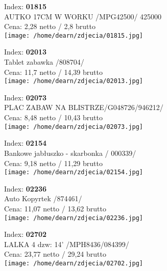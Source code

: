 {Index: \textbf{01815}\\
AUTKO 17CM W WORKU  /MPG42500/                  425000\\
Cena: 2,28 netto / 2,8 brutto\\
  \texttt{[image: /home/dearn/zdjecia/01815.jpg]}}\newline\newline

{Index: \textbf{02013}\\
Tablet zabawka /808704/\\
Cena: 11,7 netto / 14,39 brutto\\
  \texttt{[image: /home/dearn/zdjecia/02013.jpg]}}\newline\newline

{Index: \textbf{02073}\\
PLAC ZABAW NA BLISTRZE/G048726/946212/\\
Cena: 8,48 netto / 10,43 brutto\\
  \texttt{[image: /home/dearn/zdjecia/02073.jpg]}}\newline\newline

{Index: \textbf{02154}\\
Bankowe jabłuszko - skarbonka / 000339/\\
Cena: 9,18 netto / 11,29 brutto\\
  \texttt{[image: /home/dearn/zdjecia/02154.jpg]}}\newline\newline

{Index: \textbf{02236}\\
Auto Kopyrtek /874461/\\
Cena: 11,07 netto / 13,62 brutto\\
  \texttt{[image: /home/dearn/zdjecia/02236.jpg]}}\newline\newline

{Index: \textbf{02702}\\
LALKA 4 dzw: 14' /MPH8436/084399/\\
Cena: 23,77 netto / 29,24 brutto\\
  \texttt{[image: /home/dearn/zdjecia/02702.jpg]}}\newline\newline

